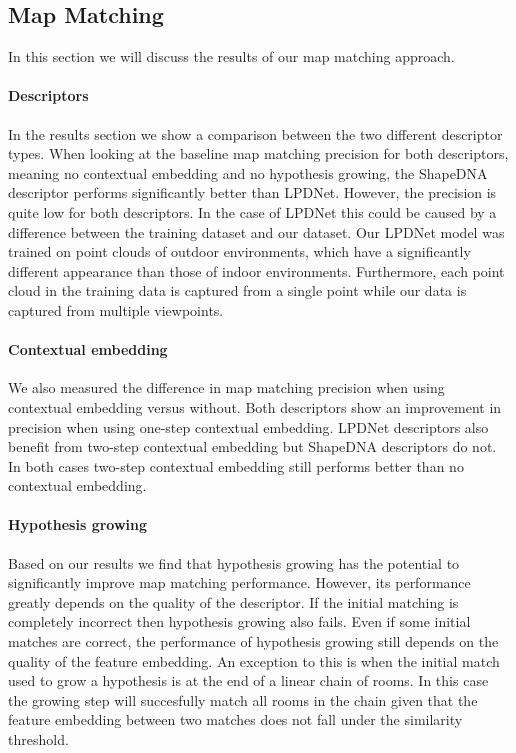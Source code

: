 
\subsection{Map Matching}
In this section we will discuss the results of our map matching approach. 

\paragraph{Descriptors}
In the results section we show a comparison between the two different descriptor types. When looking at the baseline map matching precision for both descriptors, meaning no contextual embedding and no hypothesis growing, the ShapeDNA descriptor performs significantly better than LPDNet. However, the precision is quite low for both descriptors. In the case of LPDNet this could be caused by a difference between the training dataset and our dataset. Our LPDNet model was trained on point clouds of outdoor environments, which have a significantly different appearance than those of indoor environments. Furthermore, each point cloud in the training data is captured from a single point while our data is captured from multiple viewpoints.

\paragraph{Contextual embedding}
We also measured the difference in map matching precision when using contextual embedding versus without. Both descriptors show an improvement in precision when using one-step contextual embedding. LPDNet descriptors also benefit from two-step contextual embedding but ShapeDNA descriptors do not. In both cases two-step contextual embedding still performs better than no contextual embedding.

\paragraph{Hypothesis growing}
Based on our results we find that hypothesis growing has the potential to significantly improve map matching performance. However, its performance greatly depends on the quality of the descriptor. If the initial matching is completely incorrect then hypothesis growing also fails. Even if some initial matches are correct, the performance of hypothesis growing still depends on the quality of the feature embedding. An exception to this is when the initial match used to grow a hypothesis is at the end of a linear chain of rooms. In this case the growing step will succesfully match all rooms in the chain given that the feature embedding between two matches does not fall under the similarity threshold. 

